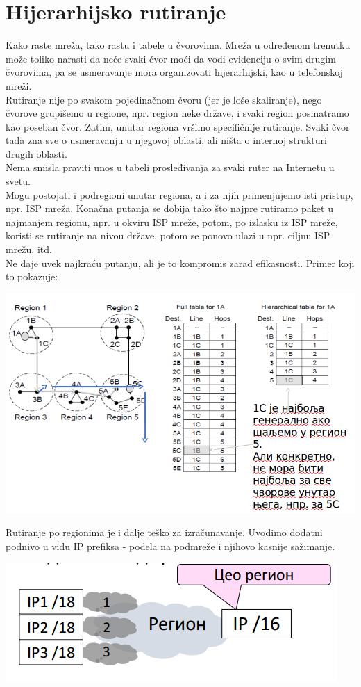 \documentclass{article} %
\begin{document}
\section{Hijerarhijsko rutiranje}
Kako raste mreža, tako rastu i tabele u čvorovima. Mreža u određenom trenutku može toliko narasti da neće svaki čvor moći da vodi evidenciju o svim drugim čvorovima, pa se usmeravanje mora organizovati hijerarhijski, kao u telefonskoj mreži.\\

Rutiranje nije po svakom pojedinačnom čvoru (jer je loše skaliranje), nego čvorove grupišemo u regione, npr. region neke države, i svaki region posmatramo kao poseban čvor. Zatim, unutar regiona vršimo specifičnije rutiranje. Svaki čvor tada zna sve o usmeravanju u njegovoj oblasti, ali ništa o internoj strukturi drugih oblasti.\\
 Nema smisla praviti unos u tabeli prosleđivanja za svaki ruter na Internetu u  svetu.\\
Mogu postojati i podregioni unutar regiona, a i za njih primenjujemo isti pristup, npr. ISP mreža. Konačna putanja se dobija tako što najpre rutiramo paket u najmanjem regionu, npr. u okviru ISP mreže, potom, po izlasku iz ISP mreže, koristi se rutiranje na nivou države, potom se ponovo ulazi u npr. ciljnu ISP mrežu, itd.\\
Ne daje uvek najkraću putanju, ali je to kompromis zarad efikasnosti. Primer koji to pokazuje:
\begin{center}
	\includegraphics[scale=0.4]{hijerRutiranje}
\end{center}
Rutiranje po regionima je i dalje teško za izračunavanje. Uvodimo dodatni podnivo u vidu IP prefiksa - podela na podmreže i njihovo kasnije sažimanje.
\begin{center}
	\includegraphics[scale=0.4]{hijerRutiranje2}
\end{center} 
\end{document}
